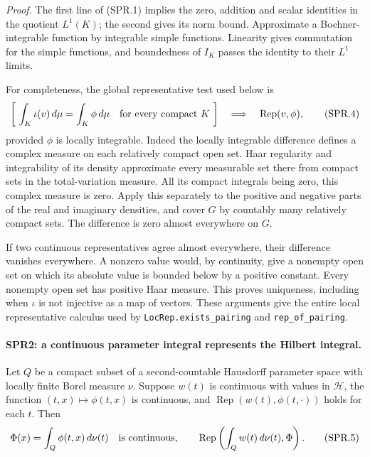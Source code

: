 \emph{Proof.}
The first line of (SPR.1) implies the zero, addition and scalar
identities in the quotient \(L^1(K)\); the second gives its norm
bound.  Approximate a Bochner-integrable function by integrable simple
functions.  Linearity gives commutation for the simple functions,
and boundedness of \(I_K\) passes the identity to their \(L^1\) limits.

For completeness, the global representative test used below is
\[
 \left[\ \int_K\iota(v)\,d\mu=\int_K\phi\,d\mu
           \quad\hbox{for every compact }K\ \right]
 \quad\Longrightarrow\quad \operatorname{Rep}(v,\phi),
 \tag{SPR.4}
\]
provided \(\phi\) is locally integrable.
Indeed the locally integrable difference defines a complex measure
on each relatively compact open set.  Haar regularity and
integrability of its density approximate every measurable set there
from compact sets in the total-variation measure.  All its compact
integrals being zero, this complex measure is zero.  Apply this
separately to the positive and negative parts of the real and
imaginary densities, and cover \(G\) by countably many relatively
compact sets.  The difference is zero almost everywhere on \(G\).

If two continuous representatives agree almost everywhere, their
difference vanishes everywhere.  A nonzero value would, by
continuity, give a nonempty open set on which its absolute value is
bounded below by a positive constant.  Every nonempty open set has
positive Haar measure.  This proves uniqueness, including when
\(\iota\) is not injective as a map of vectors.
These arguments give the entire local representative calculus used
by \texttt{LocRep.\allowbreak exists\_\allowbreak pairing} and \texttt{rep\_\allowbreak of\_\allowbreak pairing}.

\paragraph{SPR2: a continuous parameter integral represents the Hilbert integral.}
\label{claim:SPR2}
Let \(Q\) be a compact subset of a second-countable Hausdorff parameter
space with locally finite Borel measure \(\nu\).  Suppose \(w(t)\) is
continuous with values in \(\mathcal H\), the function
\((t,x)\mapsto\phi(t,x)\) is continuous, and
\(\operatorname{Rep}(w(t),\phi(t,\cdot))\) holds for each \(t\).
Then
\[
 \Phi(x)=\int_Q\phi(t,x)\,d\nu(t)
 \quad\hbox{is continuous},\qquad
 \operatorname{Rep}\left(\int_Qw(t)\,d\nu(t),\Phi\right).
 \tag{SPR.5}
\]

